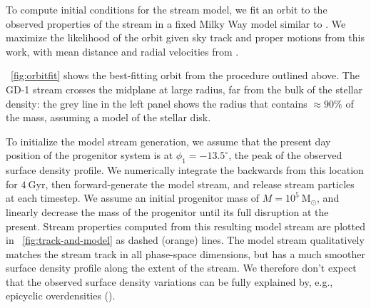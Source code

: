 \documentclass[modern]{aastex62}
\newcommand{\package}[1]{\textsl{#1}}
\newcommand{\msun}{\textrm{M}_\odot}
\newcommand{\kpc}{\textrm{kpc}}
\newcommand{\kms}{\ensuremath{\textrm{km}~\textrm{s}^{-1}}}
\begin{document}
To compute initial conditions for the stream model, we fit an orbit to the
observed properties of the stream in a fixed Milky Way model similar to \citet{Bovy:2015}.
We maximize the likelihood of the orbit given sky track and proper motions from
this work, with mean distance and radial velocities from
\cite{Koposov:2010}.

\figurename~\ref{fig:orbitfit} shows the best-fitting orbit from the procedure
outlined above.
The GD-1 stream crosses the midplane at large radius, far from the bulk of the
stellar density:
the grey line in the left panel shows the radius that contains $\approx 90\%$ of
the mass, assuming a \citet{Bovy:2012} model of the stellar disk.

To initialize the model stream generation, we assume that the present day
position of the progenitor system is at $\phi_1 = -13.5^\circ$, the peak of the
observed surface density profile.
We numerically integrate the backwards from this location for $4~\textrm{Gyr}$,
then forward-generate the model stream, and release stream particles at each
timestep.
We assume an initial progenitor mass of $M=10^5~\msun$, and linearly decrease
the mass of the progenitor until its full disruption at the present.
Stream properties computed from this resulting model stream are plotted in
\figurename~\ref{fig:track-and-model} as dashed (orange) lines.
The model stream qualitatively matches the stream track in all phase-space
dimensions, but has a much smoother surface density profile along the extent of
the stream.
We therefore don't expect that the observed surface density variations can be fully explained
by, e.g., epicyclic overdensities (\citealt{Kupper:2012}).
\end{document}
